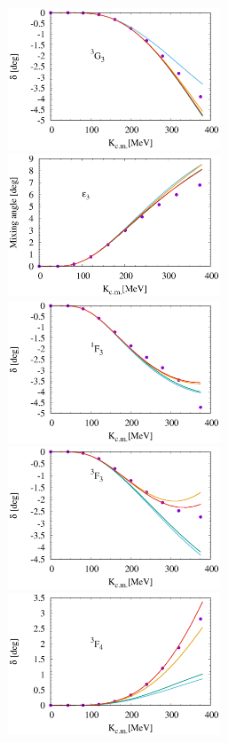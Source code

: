 \documentclass{article}
\begin{document}
\begin{figure}[htbp]
\includegraphics[width=0.5\textwidth]{6_3g3.eps}
\includegraphics[width=0.5\textwidth]{6_e3.eps}
\includegraphics[width=0.5\textwidth]{6_1f3.eps}
\includegraphics[width=0.5\textwidth]{6_3f3.eps}
\includegraphics[width=0.5\textwidth]{6_3f4.eps}

\end{figure}
\end{document}
